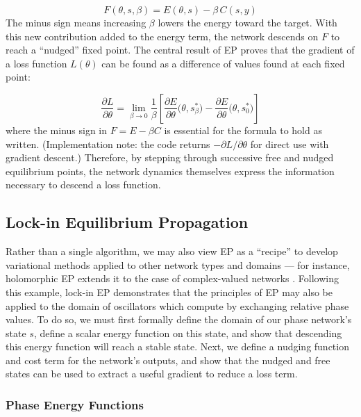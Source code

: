 \begin{equation}
F(\theta, s, \beta) = E(\theta, s) - \beta\, C(s, y)
\end{equation}
The minus sign means increasing $\beta$ lowers the energy toward the target.
With this new contribution added to the energy term, the network descends on $F$ to reach a ``nudged'' fixed point. The central result of EP proves that the gradient of a loss function $L(\theta)$ can be found as a difference of values found at each fixed point:

\begin{equation}\label{eq:ep-theorem}
\frac{\partial L}{\partial \theta} = \lim_{\beta \to 0} \frac{1}{\beta}\left[\frac{\partial E}{\partial \theta}\big(\theta, s_\beta^*\big) - \frac{\partial E}{\partial \theta}\big(\theta, s_0^*\big)\right]
\end{equation}
where the minus sign in $F = E - \beta C$ is essential for the formula to hold as written. (Implementation note: the code returns $-\partial L/\partial \theta$ for direct use with gradient descent.) Therefore, by stepping through successive free and nudged equilibrium points, the network dynamics themselves express the information necessary to descend a loss function. 

\subsection{Lock-in Equilibrium Propagation}
\label{sec:LIEP}

Rather than a single algorithm, we may also view EP as a ``recipe'' to develop variational methods applied to other network types and domains --- for instance, holomorphic EP extends it to the case of complex-valued networks \cite{laborieuxHolomorphicEquilibriumPropagation2022}. Following this example, lock-in EP demonstrates that the principles of EP may also be applied to the domain of oscillators which compute by exchanging relative phase values. To do so, we must first formally define the domain of our phase network's state $s$, define a scalar energy function on this state, and show that descending this energy function will reach a stable state. Next, we define a nudging function and cost term for the network's outputs, and show that the nudged and free states can be used to extract a useful gradient to reduce a loss term. 

\subsubsection{Phase Energy Functions}

